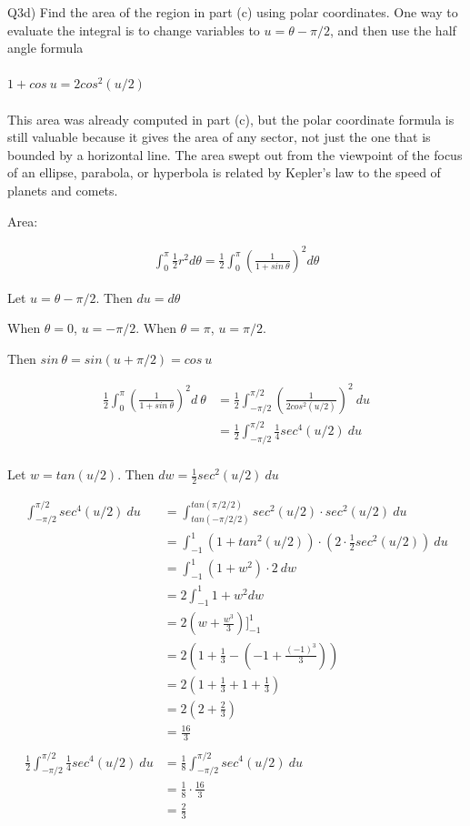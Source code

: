 \documentclass[9pt]{article}
\begin{document}
\begin{tcolorbox}
  Q3d) Find the area of the region in part (c) using polar coordinates. One way to evaluate the integral is to change variables to $u = \theta - \pi / 2$, and then use the half angle formula \\
  \\
  $1 + cos\ u = 2 cos^2(u/2)$ \\
  \\
  This area was already computed in part (c), but the polar coordinate formula is still valuable because it gives the area of any sector, not just the one that is bounded by a horizontal line. The area swept out from the viewpoint of the focus of an ellipse, parabola, or hyperbola is related by Kepler's law to the speed of planets and comets.
\end{tcolorbox}

Area:

\begin{align*}
  \int_0^{\pi} \frac{1}{2} r^2 d\theta = \frac{1}{2} \int_0^{\pi} (\frac{1}{1 + sin\ \theta})^2 d\theta
\end{align*}

Let $u = \theta - \pi / 2$. Then $du = d \theta$

When $\theta = 0$, $u = -\pi / 2$. When $\theta = \pi$, $u = \pi / 2$.

Then $sin\ \theta = sin(u + \pi / 2) = cos\ u$

\begin{align*}
  \frac{1}{2} \int_0^{\pi} (\frac{1}{1 + sin\ \theta})^2 d\ \theta &= \frac{1}{2} \int_{-\pi / 2}^{\pi / 2} (\frac{1}{2cos^2(u / 2)})^2\ du \\
  &= \frac{1}{2} \int_{-\pi / 2}^{\pi / 2} \frac{1}{4} sec^4(u / 2)\ du \\
\end{align*}

Let $w = tan(u / 2)$. Then $dw = \frac{1}{2} sec^2(u / 2) \ du$

\begin{align*}
  \int_{-\pi / 2}^{\pi / 2} sec^4(u / 2)\ du &= \int_{tan(-\pi / 2 / 2)}^{tan(\pi / 2 / 2)} sec^2(u / 2) \cdot sec^2(u / 2) \ du \\
  &= \int_{-1}^{1} (1 + tan^2(u / 2)) \cdot (2 \cdot \frac{1}{2} sec^2(u / 2)) \ du \\
  &= \int_{-1}^{1} (1 + w^2) \cdot 2 \ dw \\
  &= 2 \int_{-1}^{1} 1 + w^2 dw \\
  &= 2 (w + \frac{w^3}{3}) \bigg]_{-1}^1 \\
  &= 2 (1 + \frac{1}{3} - (-1 + \frac{(-1)^3}{3})) \\
  &= 2 (1 + \frac{1}{3} + 1 + \frac{1}{3}) \\
  &= 2 (2 + \frac{2}{3}) \\
  &= \frac{16}{3} \\
  \\
  \frac{1}{2} \int_{-\pi / 2}^{\pi / 2} \frac{1}{4} sec^4(u / 2)\ du &= \frac{1}{8} \int_{-\pi / 2}^{\pi / 2} sec^4(u / 2)\ du \\
  &= \frac{1}{8} \cdot \frac{16}{3} \\
  &= \frac{2}{3}
\end{align*}
\end{document}
